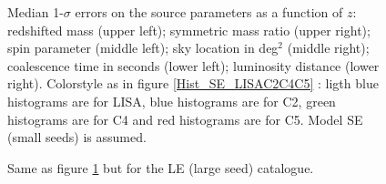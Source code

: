 \documentclass{iopart}
\begin{document}

\begin{figure}
\caption{Median 1-$\sigma$ errors on the source parameters as a function of 
$z$: redshifted mass (upper left); symmetric mass ratio (upper right); spin parameter (middle left); sky location in deg$^2$ (middle right); coalescence time in seconds (lower left); luminosity distance (lower right). Colorstyle as in figure \ref{Hist_SE_LISAC2C4C5} : ligth blue histograms are for LISA, blue histograms are for C2, green histograms are for C4 and red histograms are for C5. Model SE (small seeds) is assumed.
\label{MedianErrs_SE_LISAC2C4C5} } 
\end{figure}

\begin{figure}
\caption{Same as figure \ref{MedianErrs_SE_LISAC2C4C5} but for the LE (large seed) catalogue.
\label{MedianErrs_LE_LISAC2C4C5} } 
\end{figure}
\end{document}
